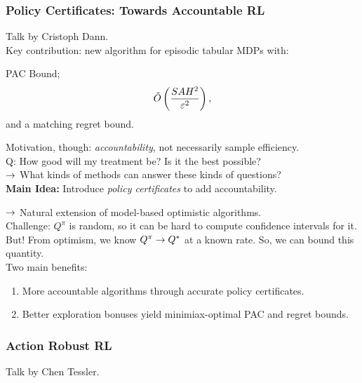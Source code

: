 \spacerule

\subsubsection{Policy Certificates: Towards Accountable RL~\cite{dann2018policy}}

Talk by Cristoph Dann. \\

Key contribution: new algorithm for episodic tabular MDPs with:
\begin{theorem}
PAC Bound;
\[
\tilde{O}\left(\frac{SAH^2}{\varepsilon^2}\right),
\]
and a matching regret bound.
\end{theorem}

Motivation, though: {\it accountability}, not necessarily sample efficiency. \\

Q: How good will my treatment be? Is it the best possible? \\
$\rightarrow$ What kinds of methods can answer these kinds of questions?  \\

{\bf Main Idea:} Introduce {\it policy certificates} to add accountability.

$\rightarrow$ Natural extension of model-based optimistic algorithms. \\

Challenge: $Q^\pi$ is random, so it can be hard to compute confidence intervals for it. But! From optimism, we know $Q^\pi \rightarrow Q^*$ at a known rate. So, we can bound this quantity. \\

Two main benefits:
\begin{enumerate}
    \item More accountable algorithms through accurate policy certificates.
    \item Better exploration bonuses yield minimiax-optimal PAC and regret bounds.
\end{enumerate}

\spacerule

\subsubsection{Action Robust RL~\cite{tessler2019action}}


Talk by Chen Tessler. \\


